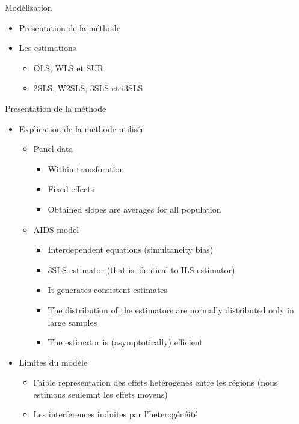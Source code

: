 \documentclass[11pt,ignorenonframetext,]{beamer}
\providecommand{\tightlist}{%
  \setlength{\itemsep}{0pt}\setlength{\parskip}{0pt}}
\begin{document}
\begin{frame}{Modèlisation}
\protect\hypertarget{modelisation-1}{}

\begin{itemize}
\tightlist
\item
  Presentation de la méthode
\item
  Les estimations

  \begin{itemize}
  \tightlist
  \item
    OLS, WLS et SUR
  \item
    2SLS, W2SLS, 3SLS et i3SLS
  \end{itemize}
\end{itemize}

\end{frame}

\begin{frame}{Presentation de la méthode}
\protect\hypertarget{presentation-de-la-methode}{}

\begin{itemize}
\tightlist
\item
  Explication de la méthode utilisée

  \begin{itemize}
  \tightlist
  \item
    Panel data

    \begin{itemize}
    \tightlist
    \item
      Within transforation
    \item
      Fixed effects
    \item
      Obtained slopes are averages for all population
    \end{itemize}
  \item
    AIDS model

    \begin{itemize}
    \tightlist
    \item
      Interdependent equations (simultaneity bias)
    \item
      3SLS estimator (that is identical to ILS estimator)
    \item
      It generates consistent estimates
    \item
      The distribution of the estimators are normally distributed only
      in large samples
    \item
      The estimator is (asymptotically) efficient
    \end{itemize}
  \end{itemize}
\item
  Limites du modèle

  \begin{itemize}
  \tightlist
  \item
    Faible representation des effets hetérogenes entre les régions (nous
    estimons seulemnt les effets moyens)
  \item
    Les interferences induites par l'heterogénéité
  \end{itemize}
\end{itemize}

\end{frame}
\end{document}

